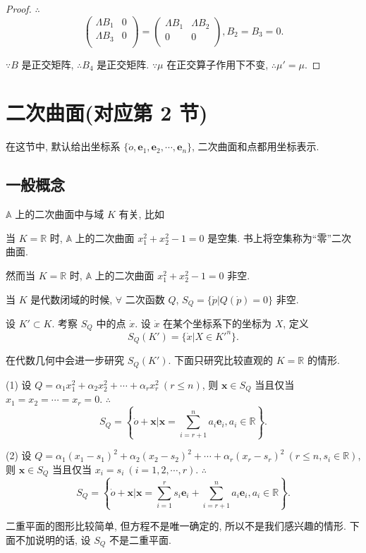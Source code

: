 \documentclass{ctexart}
\begin{document}
\begin{proof}
    $\therefore$
    \[\begin{pmatrix}
        \Lambda B_1 & 0 \\
        \Lambda B_3 & 0 \\
    \end{pmatrix}=\begin{pmatrix}
        \Lambda B_1 & \Lambda B_2 \\
        0 & 0 \\
    \end{pmatrix}, B_2=B_3=0.\]

    $\because B$ 是正交矩阵, $\therefore B_4$ 是正交矩阵. $\because\mu$ 在正交算子作用下不变, $\therefore\mu'=\mu$.
\end{proof}
\section{二次曲面(对应第 2 节)}
在这节中, 默认给出坐标系 $\{\dot{o},\boldsymbol{e}_1,\boldsymbol{e}_2,\cdots,\boldsymbol{e}_n\}$, 二次曲面和点都用坐标表示.
\subsection{一般概念}
$\mathbb{A}$ 上的二次曲面中与域 $K$ 有关, 比如
\begin{example}
    当 $K=\mathbb{R}$ 时, $\mathbb{A}$ 上的二次曲面 $x_1^2+x_2^2-1=0$ 是空集. 书上将空集称为``零''二次曲面.

    然而当 $K=\mathbb{R}$ 时, $\mathbb{A}$ 上的二次曲面 $x_1^2+x_2^2-1=0$ 非空.
\end{example}
当 $K$ 是代数闭域的时候, $\forall$ 二次函数 $Q$, $S_Q=\{\dot{p}|Q(\dot{p})=0\}$ 非空.

设 $K'\subset K$. 考察 $S_Q$ 中的点 $\dot{x}$. 设 $\dot{x}$ 在某个坐标系下的坐标为 $X$, 定义
\[S_Q(K')=\{\dot{x}|X\in K'^n\}.\]

在代数几何中会进一步研究 $S_Q(K')$. 下面只研究比较直观的 $K=\mathbb{R}$ 的情形.
\begin{example}
    (1) 设 $Q=\alpha_1x^2_1+\alpha_2x^2_2+\cdots+\alpha_rx^2_r\ (r\leq n)$, 则 $\boldsymbol{x}\in S_Q$ 当且仅当 $x_1=x_2=\cdots=x_r=0$. $\therefore$
    \[S_Q=\left\{\dot{o}+\boldsymbol{x}\Bigg|\boldsymbol{x}=\sum\limits_{i=r+1}^na_i\boldsymbol{e}_i,a_i\in\mathbb{R}\right\}.\]

    (2) 设 $Q=\alpha_1(x_1-s_1)^2+\alpha_2(x_2-s_2)^2+\cdots+\alpha_r(x_r-s_r)^2\ (r\leq n,s_i\in\mathbb{R})$, 则 $\boldsymbol{x}\in S_Q$ 当且仅当 $x_i=s_i\ (i=1,2,\cdots,r)$. $\therefore$
    \[S_Q=\left\{\dot{o}+\boldsymbol{x}\Bigg|\boldsymbol{x}=\sum\limits_{i=1}^rs_i\boldsymbol{e}_i+\sum\limits_{i=r+1}^na_i\boldsymbol{e}_i,a_i\in\mathbb{R}\right\}.\]
\end{example}
二重平面的图形比较简单, 但方程不是唯一确定的, 所以不是我们感兴趣的情形. 下面不加说明的话, 设 $S_Q$ 不是二重平面.
\end{document}
